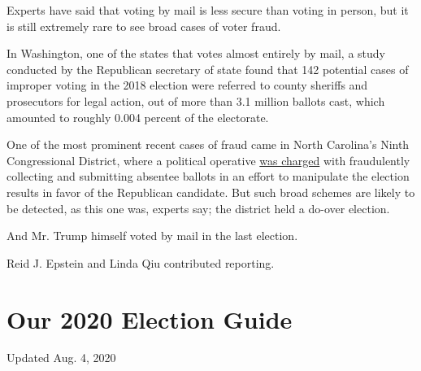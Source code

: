 Experts have said that voting by mail is less secure than voting in
person, but it is still extremely rare to see broad cases of voter
fraud.

In Washington, one of the states that votes almost entirely by mail, a
study conducted by the Republican secretary of state found that 142
potential cases of improper voting in the 2018 election were referred to
county sheriffs and prosecutors for legal action, out of more than 3.1
million ballots cast, which amounted to roughly 0.004 percent of the
electorate.

One of the most prominent recent cases of fraud came in North Carolina's
Ninth Congressional District, where a political operative
\href{https://www.nytimes3xbfgragh.onion/2019/07/30/us/mccrae-dowless-indictment.html}{was
charged} with fraudulently collecting and submitting absentee ballots in
an effort to manipulate the election results in favor of the Republican
candidate. But such broad schemes are likely to be detected, as this one
was, experts say; the district held a do-over election.

And Mr. Trump himself voted by mail in the last election.

Reid J. Epstein and Linda Qiu contributed reporting.

\hypertarget{our-2020-election-guide}{%
\section{Our 2020 Election Guide}\label{our-2020-election-guide}}

Updated Aug. 4, 2020

